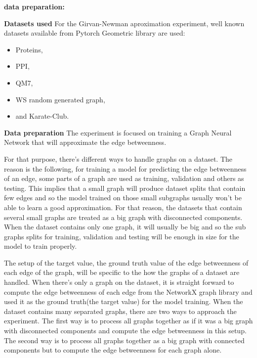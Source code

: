 \textbf{data preparation:}


\textbf{Datasets used}
For the Girvan-Newman aproximation experiment, well known datasets available from Pytorch Geometric library are used:
\begin{itemize}
	\item Proteins,
	\item PPI,
	\item QM7,
	\item WS random generated graph,
	\item and Karate-Club.
\end{itemize}

\textbf{Data preparation}
The experiment is focused on training a Graph Neural Network that will approximate the edge betweenness. 

For that purpose, there's different ways to handle graphs on a dataset. The reason is the following, for training  a model for predicting the edge betweenness of an edge, some parts of a graph are used as training, validation and others as testing. This implies that a small graph will produce dataset splits that contain few edges and so the model trained on those small subgraphs usually won't be able to learn a good approximation. For that reason, the datasets that contain  several small graphs are treated as a big graph with disconnected components. When the dataset contains only one graph, it will usually be big and so the sub graphs splits for training, validation and testing will be enough in size for the model to train properly.

The setup of the target value, the ground truth value of the edge betweenness of each edge of the graph, will be specific to the how the graphs of a dataset are handled. When there's only a graph on the dataset, it is straight forward to compute the edge betweenness of each edge from the NetworkX graph library and used it as the ground truth(the target value) for the model training. When the dataset contains many separated graphs, there are two ways to approach the experiment. The first way is to process all graphs together as if it was a big graph with disconnected components and compute the edge betweenness in this setup. The second way is to process all graphs together as a big graph with connected components but to compute the edge betweenness for each graph alone. 


